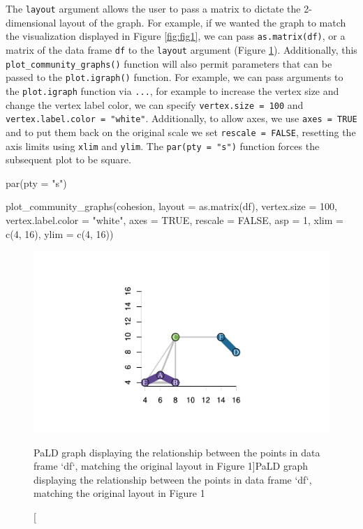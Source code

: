 The \texttt{layout} argument allows the user to pass a matrix to dictate
the 2-dimensional layout of the graph. For example, if we wanted the
graph to match the visualization displayed in Figure \ref{fig:fig1}, we
can pass \texttt{as.matrix(df)}, or a matrix of the data frame
\texttt{df} to the \texttt{layout} argument (Figure \ref{fig:fig3}).
Additionally, this \texttt{plot\_community\_graphs()} function will also
permit parameters that can be passed to the \texttt{plot.igraph()}
function. For example, we can pass arguments to the \texttt{plot.igraph}
function via \texttt{...}, for example to increase the vertex size and
change the vertex label color, we can specify
\texttt{vertex.size\ =\ 100} and
\texttt{vertex.label.color\ =\ "white"}. Additionally, to allow axes, we
use \texttt{axes\ =\ TRUE} and to put them back on the original scale we
set \texttt{rescale\ =\ FALSE}, resetting the axis limits using
\texttt{xlim} and \texttt{ylim}. The \texttt{par(pty\ =\ "s")} function
forces the subsequent plot to be square.

\begin{Schunk}
\begin{Sinput}
par(pty = "s")

plot_community_graphs(cohesion, 
                      layout = as.matrix(df),
                      vertex.size = 100,
                      vertex.label.color = "white",
                      axes = TRUE,
                      rescale = FALSE,
                      asp = 1,
                      xlim = c(4, 16),
                      ylim = c(4, 16))
\end{Sinput}
\begin{figure}
\includegraphics{manuscript_files/figure-latex/fig3-1} \caption[PaLD graph displaying the relationship between the points in data frame `df`, matching the original layout in Figure 1]{PaLD graph displaying the relationship between the points in data frame `df`, matching the original layout in Figure 1}\label{fig:fig3}
\end{figure}
\end{Schunk}

